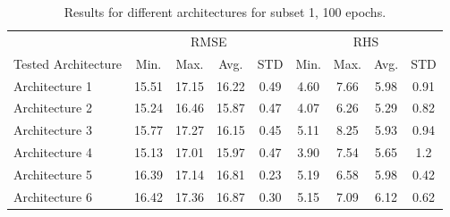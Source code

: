 \documentclass[preprint,12pt]{elsarticle}%
\begin{document}
\begin{table}
\begin{center}
\caption{Results for different architectures for subset 1, 100 epochs.}%
%

\begin{tabular}
[c]{l|cccc|cccc}\hline
& \multicolumn{4}{|c}{RMSE} & \multicolumn{4}{|c}{RHS}\\
Tested Architecture & Min. & Max. & Avg. & STD & Min. & Max. & Avg. &
STD\\\hline\hline
Architecture 1 & 15.51 & 17.15 & 16.22 & 0.49 & 4.60 & 7.66 & 5.98 & 0.91\\
Architecture 2 & 15.24 & 16.46 & 15.87 & 0.47 & 4.07 & 6.26 & 5.29 & 0.82\\
Architecture 3 & 15.77 & 17.27 & 16.15 & 0.45 & 5.11 & 8.25 & 5.93 & 0.94\\
Architecture 4 & 15.13 & 17.01 & 15.97 & 0.47 & 3.90 & 7.54 & 5.65 & 1.2\\
Architecture 5 & 16.39 & 17.14 & 16.81 & 0.23 & 5.19 & 6.58 & 5.98 & 0.42\\
Architecture 6 & 16.42 & 17.36 & 16.87 & 0.30 & 5.15 & 7.09 & 6.12 &
0.62\\\hline
\end{tabular}
\label{table:tested_architectures_100}%

\end{center}
\end{table}%
%
\end{document}
